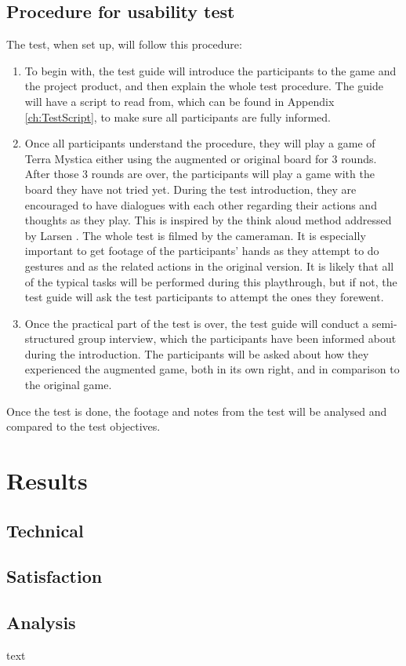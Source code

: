 \subsection{Procedure for usability test}
The test, when set up, will follow this procedure: 

\begin{enumerate}
\item To begin with, the test guide will introduce the participants to the game and the project product, and then explain the whole test procedure. The guide will have a script to read from, which can be found in Appendix \ref{ch:TestScript}, to make sure all participants are fully informed.
\item Once all participants understand the procedure, they will play a game of Terra Mystica either using the augmented or original board for 3 rounds. After those 3 rounds are over, the participants will play a game with the board they have not tried yet.  During the test introduction, they are encouraged to have dialogues with each other regarding their actions and thoughts as they play. This is inspired by the think aloud method addressed by Larsen \citep{TestingLecture}. The whole test is filmed by the cameraman. It is especially important to get footage of the participants' hands as they attempt to do gestures and as the related actions in the original version. It is likely that all of the typical tasks will be performed during this playthrough, but if not, the test guide will ask the test participants to attempt the ones they forewent.
\item Once the practical part of the test is over, the test guide will conduct a semi-structured group interview, which the participants have been informed about during the introduction. The participants will be asked about how they experienced the augmented game, both in its own right, and in comparison to the original game.
\end{enumerate}

Once the test is done, the footage and notes from the test will be analysed and compared to the test objectives.

\section{Results}
\subsection{Technical}
\subsection{Satisfaction}
\subsection{Analysis}
text